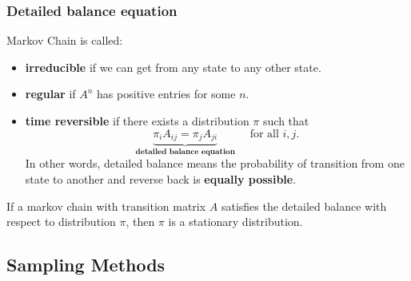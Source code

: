 \subsubsection*{Detailed balance equation}
Markov Chain is called:
\begin{itemize}
    \item \textbf{irreducible} if we can get from any state to any other state.
    \item \textbf{regular} if $A^n$ has positive entries for some $n$.
    \item \textbf{time reversible} if there exists a distribution $\pi$ such that
    $$
    \underbrace{\pi_i A_{i j}=\pi_j A_{j i}}_{\textbf{detailed balance equation}} \quad \text { for all } i, j .
    $$
    In other words, detailed balance means the probability of transition from one state to another and reverse back is \textbf{equally possible}.
\end{itemize}
\begin{theorem}
    If a markov chain with transition matrix $A$ satisfies the detailed balance with respect to distribution $\pi$, then $\pi$ is a stationary distribution.
\end{theorem}

\subsection{Sampling Methods}
